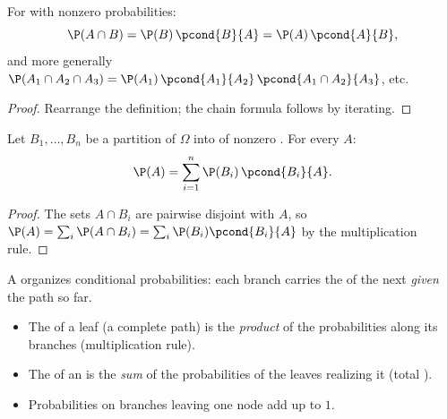 \begin{proposition}\label{prop:g12:condprob:product}
For  with nonzero probabilities:
\[
\P(A \cap B) = \P(B)\,\pcond{B}{A} = \P(A)\,\pcond{A}{B},
\]
and more generally
$\P(A_1 \cap A_2 \cap A_3) = \P(A_1)\,\pcond{A_1}{A_2}\,
\pcond{A_1 \cap A_2}{A_3}$, etc.
\end{proposition}

\begin{proof}
Rearrange the definition; the chain formula follows by iterating.
\end{proof}

\begin{theorem}\label{thm:g12:condprob:total}
Let $B_1, \dots, B_n$ be a partition of $\Omega$ into  of nonzero
. For every  $A$:
\[
\P(A) = \sum_{i=1}^{n} \P(B_i)\,\pcond{B_i}{A}.
\]
\end{theorem}

\begin{proof}
The sets $A \cap B_i$ are pairwise disjoint with  $A$, so
$\P(A) = \sum_i \P(A \cap B_i) = \sum_i \P(B_i)\pcond{B_i}{A}$ by the
multiplication rule.
\end{proof}

\begin{method}\label{met:g12:condprob:tree}
A  organizes conditional probabilities: each branch carries the
 of the next  \emph{given} the path so far.
\begin{itemize}
  \item The  of a leaf (a complete path) is the \emph{product} of
        the probabilities along its branches (multiplication rule).
  \item The  of an  is the \emph{sum} of the probabilities
        of the leaves realizing it (total ).
  \item Probabilities on branches leaving one node add up to $1$.
\end{itemize}
\end{method}

